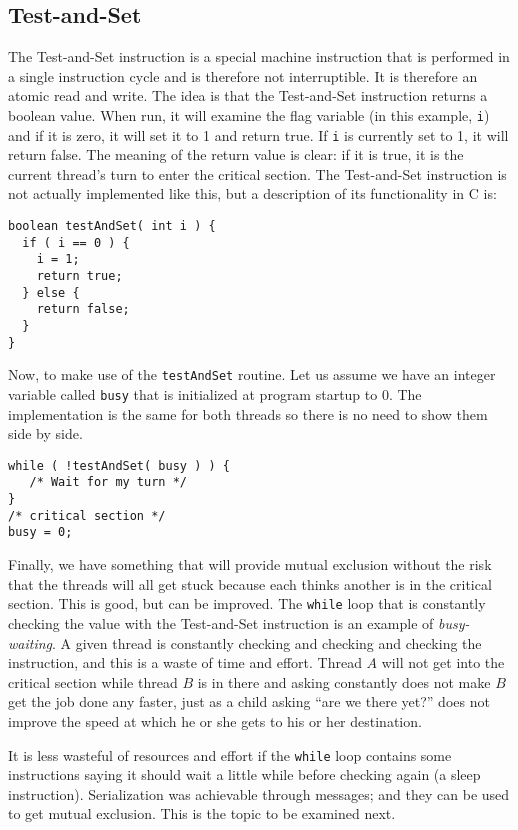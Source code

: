 \subsection*{Test-and-Set}
The Test-and-Set instruction is a special machine instruction that is performed in a single instruction cycle and is therefore not interruptible. It is therefore an atomic read and write. The idea is that the Test-and-Set instruction returns a boolean value. When run, it will examine the flag variable (in this example, \texttt{i}) and if it is zero, it will set it to 1 and return true. If \texttt{i} is currently set to 1, it will return false. The meaning of the return value is clear: if it is true, it is the current thread's turn to enter the critical section. The Test-and-Set instruction is not actually implemented like this, but a description of its functionality in C is:

\begin{verbatim}
boolean testAndSet( int i ) {
  if ( i == 0 ) {
    i = 1;
    return true;
  } else {
    return false;
  }
}
\end{verbatim}

Now, to make use of the \texttt{testAndSet} routine. Let us assume we have an integer variable called \texttt{busy} that is initialized at program startup to 0. The implementation is the same for both threads so there is no need to show them side by side.

\begin{verbatim}
while ( !testAndSet( busy ) ) {
   /* Wait for my turn */
}
/* critical section */
busy = 0;
\end{verbatim}

Finally, we have something that will provide mutual exclusion without the risk that the threads will all get stuck because each thinks another is in the critical section. This is good, but can be improved. The \texttt{while} loop that is constantly checking the value with the Test-and-Set instruction is an example of \textit{busy-waiting}. A given thread is constantly checking and checking and checking the instruction, and this is a waste of time and effort. Thread $A$ will not get into the critical section while thread $B$ is in there and asking constantly does not make $B$ get the job done any faster, just as a child asking ``are we there yet?'' does not improve the speed at which he or she gets to his or her destination.

It is less wasteful of resources and effort if the \texttt{while} loop contains some instructions saying it should wait a little while before checking again (a sleep instruction). Serialization was achievable through messages; and they can be used to get mutual exclusion. This is the topic to be examined next.





